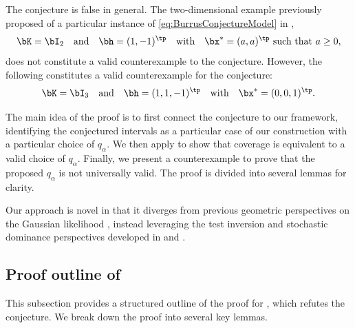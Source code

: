 \documentclass[11pt]{article}
\numberwithin{equation}{section}
\numberwithin{figure}{section}
\begin{document}
\begin{theorem}
\label{thm:burrus_false}
    The \rustburrus conjecture is false in general. 
    The two-dimensional example previously proposed of a particular instance of \eqref{eq:BurrusConjectureModel} in \cite{tenorio2007confidence},
    \begin{equation*}
    \bK = \bI_2 \quad \text{and} \quad \bh = (1,-1)^\tp \quad \text{with} \quad \bx^* = (a, a)^\tp \text{ such that } a \geq 0,
    \end{equation*}
    does not constitute a valid counterexample to the \rustburrus conjecture. 
    However, the following constitutes a valid counterexample for the \rustburrus conjecture:
  \begin{equation*}
    \bK = \bI_3 \quad \text{and} \quad \bh = (1,1,-1)^\tp \quad \text{with} \quad \bx^* = (0,0,1)^\tp.
    \end{equation*}
\end{theorem}

The main idea of the proof is to first connect the conjecture to our framework, identifying the conjectured intervals as a particular case of our construction with a particular choice of $q_\alpha$. 
We then apply  to show that coverage is equivalent to a valid choice of $q_\alpha$. 
Finally, we present a counterexample to prove that the proposed $q_\alpha$ is not universally valid.
The proof is divided into several lemmas for clarity.

Our approach is novel in that it diverges from previous geometric perspectives on the Gaussian likelihood \cite{rust_burrus,rust1994confidence, oleary_rust}, instead leveraging the test inversion and stochastic dominance perspectives developed in  and .

\subsection{Proof outline of }

This subsection provides a structured outline of the proof for , which refutes the \rustburrus conjecture.
We break down the proof into several key lemmas.
\end{document}
